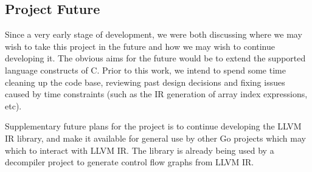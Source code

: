 
\subsection{Project Future}
\label{sec:project_future}

Since a very early stage of development, we were both discussing where we may wish to take this project in the future and how we may wish to continue developing it. The obvious aims for the future would be to extend the supported language constructs of C. Prior to this work, we intend to spend some time cleaning up the code base, reviewing past design decisions and fixing issues caused by time constraints (such as the IR generation of array index expressions, etc).

Supplementary future plans for the project is to continue developing the LLVM IR library, and make it available for general use by other Go projects which may which to interact with LLVM IR. The library is already being used by a decompiler project to generate control flow graphs from LLVM IR.

